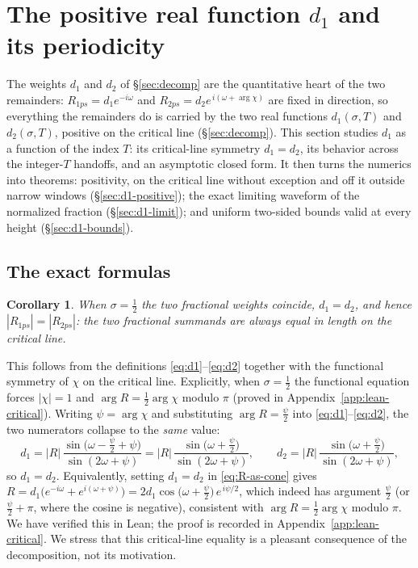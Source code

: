 \documentclass[11pt]{article}
\newtheorem{corollary}[theorem]{Corollary}
\theoremstyle{definition}
\begin{document}
\section{The positive real function \texorpdfstring{$d_1$}{d1} and its periodicity}\label{sec:d1-function}

The weights $d_1$ and $d_2$ of \S\ref{sec:decomp} are the quantitative heart
of the two remainders: $R_{1ps}=d_1e^{-i\omega}$ and
$R_{2ps}=d_2e^{\,i(\omega+\arg\chi)}$ are fixed in direction, so everything
the remainders do is carried by the two real functions
$d_1(\sigma,T)$ and $d_2(\sigma,T)$, positive on the critical line
(\S\ref{sec:decomp}). This section studies $d_1$ as a function
of the index $T$: its critical-line symmetry $d_1=d_2$, its behavior across
the integer-$T$ handoffs, and an asymptotic closed form. It then turns the
numerics into theorems: positivity, on the critical line without exception
and off it outside narrow windows (\S\ref{sec:d1-positive}); the exact
limiting waveform of the normalized fraction (\S\ref{sec:d1-limit}); and
uniform two-sided bounds valid at every height (\S\ref{sec:d1-bounds}).

\subsection{The exact formulas}\label{sec:d1-exact}

\begin{corollary}\label{cor:equal}
When $\sigma=\tfrac12$ the two fractional weights coincide, $d_1=d_2$, and
hence $|R_{1ps}| = |R_{2ps}|$: the two fractional summands are always equal
in length on the critical line.
\end{corollary}

This follows from the definitions \eqref{eq:d1}--\eqref{eq:d2} together with the
functional symmetry of $\chi$ on the critical line. Explicitly, when
$\sigma=\tfrac12$ the functional equation forces $|\chi|=1$ and
$\arg R = \tfrac12\arg\chi$ modulo $\pi$ (proved in
Appendix~\ref{app:lean-critical}). Writing $\psi=\arg\chi$ and
substituting $\arg R = \tfrac{\psi}{2}$ into \eqref{eq:d1}--\eqref{eq:d2}, the two
numerators collapse to the \emph{same} value:
\begin{equation}
d_1 = |R|\,\frac{\sin\!\bigl(\omega - \tfrac{\psi}{2} + \psi\bigr)}{\sin(2\omega+\psi)}
    = |R|\,\frac{\sin\!\bigl(\omega + \tfrac{\psi}{2}\bigr)}{\sin(2\omega+\psi)},
\qquad
d_2 = |R|\,\frac{\sin\!\bigl(\omega + \tfrac{\psi}{2}\bigr)}{\sin(2\omega+\psi)},
\end{equation}
so $d_1 = d_2$. Equivalently, setting $d_1=d_2$ in \eqref{eq:R-as-cone} gives
$R = d_1\bigl(e^{-i\omega}+e^{i(\omega+\psi)}\bigr)
   = 2d_1\cos\!\bigl(\omega+\tfrac{\psi}{2}\bigr)\,e^{\,i\psi/2}$,
which indeed has argument $\tfrac{\psi}{2}$ (or $\tfrac{\psi}{2}+\pi$, where the
cosine is negative), consistent with $\arg R=\tfrac12\arg\chi$ modulo $\pi$. We
have verified this in Lean; the proof is recorded in
Appendix~\ref{app:lean-critical}. We stress that this critical-line equality is a pleasant
consequence of the decomposition, not its motivation.
\end{document}
